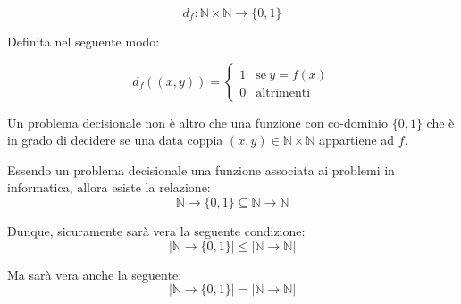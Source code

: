 \documentclass[a4paper]{article}
\begin{document}
	\begin{equation}\label{problema_decisionale}
		d_{f} : \mathbb{N}\times\mathbb{N}\longrightarrow\{0,1\}
	\end{equation}

	\noindent
	Definita nel seguente modo:
	
	\begin{equation*}
		d_{f} ((x,y)) = 
		\begin{cases}
			1 & \text{se}\:y = f(x)\\
			0 & \text{altrimenti}
		\end{cases}
	\end{equation*}
	
	\noindent
	Un problema decisionale non è altro che una funzione con co-dominio $\{0,1\}$ che è in grado di decidere se una data coppia $(x,y)\in\mathbb{N}\times\mathbb{N}$ appartiene ad $f$.
	
	Essendo un problema decisionale una funzione associata ai problemi in informatica, allora esiste la relazione:
	\begin{equation*}
		\mathbb{N}\longrightarrow\{0,1\}\subseteq\mathbb{N}\longrightarrow\mathbb{N}
	\end{equation*}
	
	\noindent
	Dunque, sicuramente sarà vera la seguente condizione:
	\begin{equation*}
		|\mathbb{N}\longrightarrow\{0,1\}| \le |\mathbb{N}\longrightarrow\mathbb{N}|
	\end{equation*}

	\noindent
	Ma sarà vera anche la seguente:
	\begin{equation*}
		|\mathbb{N}\longrightarrow\{0,1\}| = |\mathbb{N}\longrightarrow\mathbb{N}|
	\end{equation*}
\end{document}
